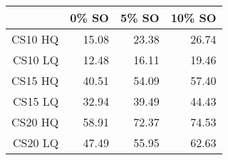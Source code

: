 \begin{table}[ht]
\begin{center}
\begin{tabular}{rrrr}
  \hline
 & 0\% SO & 5\% SO & 10\% SO \\
  \hline
CS10 HQ & 15.08 & 23.38 & 26.74 \\
  CS10 LQ & 12.48 & 16.11 & 19.46 \\
  CS15 HQ & 40.51 & 54.09 & 57.40 \\
  CS15 LQ & 32.94 & 39.49 & 44.43 \\
  CS20 HQ & 58.91 & 72.37 & 74.53 \\
  CS20 LQ & 47.49 & 55.95 & 62.63 \\
   \hline
\end{tabular}
\end{center}
\end{table}
